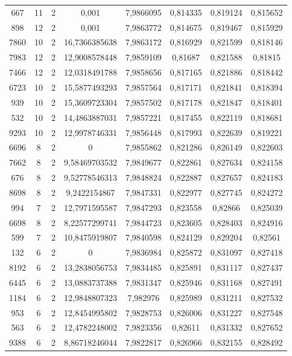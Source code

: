 \begin{longtable}{|c|c|c|c|c|c|c|c|}
667 & 11 & 2 & 0,001 & 7,9866095 & 0,814335 & 0,819124 & 0,815652 \\
898 & 12 & 2 & 0,001 & 7,9863772 & 0,814675 & 0,819467 & 0,815929 \\
7860 & 10 & 2 & 16,7366385638 & 7,9863172 & 0,816929 & 0,821599 & 0,818146 \\
7983 & 12 & 2 & 12,9008578448 & 7,9859109 & 0,81687 & 0,821588 & 0,81815 \\
7466 & 12 & 2 & 12,0318491788 & 7,9858656 & 0,817165 & 0,821886 & 0,818442 \\
6723 & 10 & 2 & 15,5877493293 & 7,9857564 & 0,817171 & 0,821841 & 0,818394 \\
939 & 10 & 2 & 15,3609723304 & 7,9857502 & 0,817178 & 0,821847 & 0,818401 \\
532 & 10 & 2 & 14,4863887031 & 7,9857221 & 0,817455 & 0,822119 & 0,818681 \\
9293 & 10 & 2 & 12,9978746331 & 7,9856448 & 0,817993 & 0,822639 & 0,819221 \\
6696 & 8 & 2 & 0 & 7,9855862 & 0,821286 & 0,826149 & 0,822603 \\
7662 & 8 & 2 & 9,58469703532 & 7,9849677 & 0,822861 & 0,827634 & 0,824158 \\
676 & 8 & 2 & 9,52778546313 & 7,9848824 & 0,822887 & 0,827657 & 0,824183 \\
8698 & 8 & 2 & 9,2422154867 & 7,9847331 & 0,822977 & 0,827745 & 0,824272 \\
994 & 7 & 2 & 12,7971595587 & 7,9847293 & 0,823558 & 0,82866 & 0,825039 \\
6698 & 8 & 2 & 8,22577299741 & 7,9844723 & 0,823605 & 0,828403 & 0,824916 \\
599 & 7 & 2 & 10,8475919807 & 7,9840598 & 0,824129 & 0,829204 & 0,82561 \\
132 & 6 & 2 & 0 & 7,9836984 & 0,825872 & 0,831097 & 0,827418 \\
8192 & 6 & 2 & 13,2838056753 & 7,9834485 & 0,825891 & 0,831117 & 0,827437 \\
6445 & 6 & 2 & 13,0883737388 & 7,9831347 & 0,825946 & 0,831168 & 0,827491 \\
1184 & 6 & 2 & 12,9848807323 & 7,982976 & 0,825989 & 0,831211 & 0,827532 \\
953 & 6 & 2 & 12,8454995802 & 7,9828753 & 0,826006 & 0,831227 & 0,827548 \\
563 & 6 & 2 & 12,4782248002 & 7,9823356 & 0,82611 & 0,831332 & 0,827652 \\
9388 & 6 & 2 & 8,86718246044 & 7,9822817 & 0,826966 & 0,832155 & 0,828492 \\

\end{longtable}
